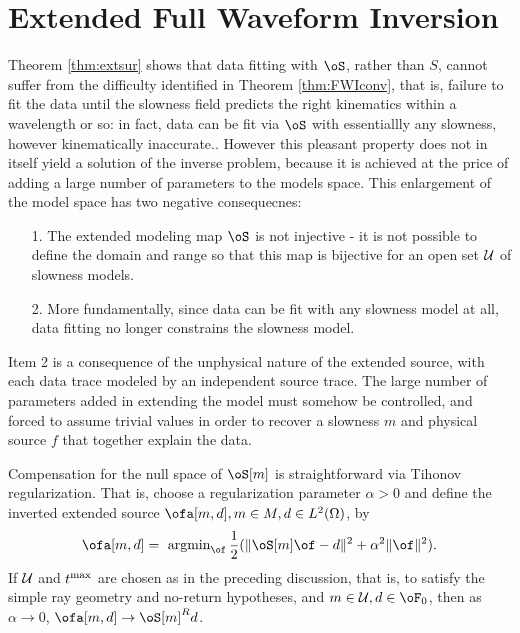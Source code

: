 \section{Extended Full Waveform Inversion}
Theorem \ref{thm:extsur} shows that data fitting with $\oS$, rather
than $S$, cannot suffer from the difficulty identified in Theorem
\ref{thm:FWIconv}, that is, failure to fit the data until the slowness
field predicts the right kinematics within a wavelength or so: in
fact, data can be fit via $\oS$ with essentiallly any slowness, however
kinematically inaccurate.. However
this pleasant property does not in itself yield a solution of the
inverse problem, because it is achieved at the price of adding a large
number of parameters to the models space. This enlargement of the
model space has two negative consequecnes:
\begin{itemize}
\item[1. ] The extended modeling map $\oS$ is not
injective - it is not possible to define the domain and range so that
this map is bijective for an open set ${\cal U}$ of slowness
models. 
\item[2. ] More fundamentally, since data
can be fit with any slowness model at all, data fitting no longer
constrains the slowness model.
\end{itemize}
Item 2 is a
consequence of the unphysical nature of the extended source, with each
data trace modeled by an independent source trace. The large number of
parameters added in extending the model must somehow be controlled, and 
forced to assume trivial values in order to recover  a slowness $m$
and physical source $f$ that together explain the data.

Compensation for the null space of $\oS[m]$ is straightforward via
Tihonov regularization. That is, choose a regularization parameter
$\alpha >0$ and define the inverted extended source $\ofa[m,d], m \in
M, d \in L^2(\Omega)$, by
\begin{equation}
\label{eqn:regextinv}
\ofa[m,d] = \mbox{ argmin}_{\of}\,\frac{1}{2}(\|\oS[m]\of - d\|^2 + \alpha^2\|\of\|^2).
\end{equation}
If ${\cal U}$ and $t^{\rm max}$ are chosen as in the preceding
discussion, that is, to satisfy the simple ray geometry and no-return
hypotheses, and $m \in {\cal U}, d \in \oF_0$, then
as $\alpha \rightarrow 0$, $\ofa[m,d] \rightarrow \oS[m]^Rd$.

